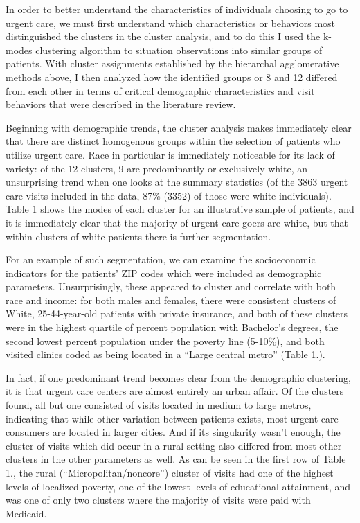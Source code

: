\documentclass[12pt,twoside]{reedthesis}
\begin{document}
  In order to better understand the characteristics of individuals
  choosing to go to urgent care, we must first understand which
  characteristics or behaviors most distinguished the clusters in the
  cluster analysis, and to do this I used the k-modes clustering algorithm
  to situation observations into similar groups of patients. With cluster
  assignments established by the hierarchal agglomerative methods above, I
  then analyzed how the identified groups or 8 and 12 differed from each
  other in terms of critical demographic characteristics and visit
  behaviors that were described in the literature review.
  
  Beginning with demographic trends, the cluster analysis makes
  immediately clear that there are distinct homogenous groups within the
  selection of patients who utilize urgent care. Race in particular is
  immediately noticeable for its lack of variety: of the 12 clusters, 9
  are predominantly or exclusively white, an unsurprising trend when one
  looks at the summary statistics (of the 3863 urgent care visits included
  in the data, 87\% (3352) of those were white individuals). Table 1 shows
  the modes of each cluster for an illustrative sample of patients, and it
  is immediately clear that the majority of urgent care goers are white,
  but that within clusters of white patients there is further
  segmentation.
  
  For an example of such segmentation, we can examine the socioeconomic
  indicators for the patients' ZIP codes which were included as
  demographic parameters. Unsurprisingly, these appeared to cluster and
  correlate with both race and income: for both males and females, there
  were consistent clusters of White, 25-44-year-old patients with private
  insurance, and both of these clusters were in the highest quartile of
  percent population with Bachelor's degrees, the second lowest percent
  population under the poverty line (5-10\%), and both visited clinics
  coded as being located in a ``Large central metro'' (Table 1.).
  
  In fact, if one predominant trend becomes clear from the demographic
  clustering, it is that urgent care centers are almost entirely an urban
  affair. Of the clusters found, all but one consisted of visits located
  in medium to large metros, indicating that while other variation between
  patients exists, most urgent care consumers are located in larger
  cities. And if its singularity wasn't enough, the cluster of visits
  which did occur in a rural setting also differed from most other
  clusters in the other parameters as well. As can be seen in the first
  row of Table 1., the rural (``Micropolitan/noncore'') cluster of visits
  had one of the highest levels of localized poverty, one of the lowest
  levels of educational attainment, and was one of only two clusters where
  the majority of visits were paid with Medicaid.
  
\end{document}
